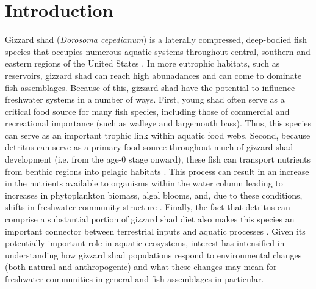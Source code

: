 \documentclass[preprint,review,12pt,authoryear]{elsarticle}
\begin{document}
\section{Introduction}
Gizzard shad (\emph{Dorosoma cepedianum}) is a laterally compressed, deep-bodied fish species that occupies numerous aquatic systems throughout central, southern and eastern regions of the United States \citep{pierce1981aspects,vanni2005linking}.  
In more eutrophic habitats, such as reservoirs, gizzard shad can reach high abunadances and can come to dominate fish assemblages. 
Because of this, gizzard shad have the potential to influence freshwater systems in a number of ways. 
First, young shad often serve as a critical food source for many fish species, including those of commercial and recreational importance (such as walleye and largemouth bass)\citep{jester1972life}. 
Thus, this species can serve as an important trophic link within aquatic food webs.
Second, because detritus can serve as a primary food source throughout much of gizzard shad development (i.e. from the age-0 stage onward), these fish can transport nutrients
from benthic regions into pelagic habitats \citep{mather1995regeneration, schaus2000effects, vanni2005linking}. 
This process can result in an increase in the nutrients available to organisms within the water column leading to increases in phytoplankton biomass, algal blooms, and, due to these conditions, shifts in freshwater community structure \citep{aday2003direct, schaus2000effects}. 
Finally, the fact that detritus can comprise a substantial portion of gizzard shad diet also makes this species an important connector between terrestrial inputs and aquatic processes \citep{schaus2000effects}.
Given its potentially important role in aquatic ecosystems, interest has intensified in understanding how gizzard shad populations respond to environmental changes (both natural and anthropogenic) and what these changes may mean for freshwater communities in general and fish assemblages in particular.
\end{document}

